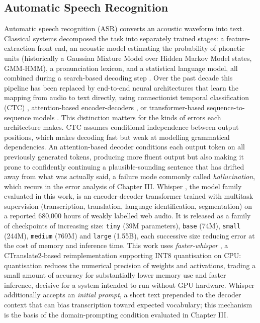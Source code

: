 \documentclass[12pt]{report}
\begin{document}
\subsection{Automatic Speech Recognition}
Automatic speech recognition (ASR) converts an acoustic waveform into text. Classical systems decomposed the task into separately trained stages: a feature-extraction front end, an acoustic model estimating the probability of phonetic units (historically a Gaussian Mixture Model over Hidden Markov Model states, GMM-HMM), a pronunciation lexicon, and a statistical language model, all combined during a search-based decoding step \cite{li2014overview}. Over the past decade this pipeline has been replaced by end-to-end neural architectures that learn the mapping from audio to text directly, using connectionist temporal classification (CTC) \cite{graves2012sequence}, attention-based encoder-decoders \cite{bahdanau2016end}, or transformer-based sequence-to-sequence models \cite{vaswani2017attention}.
This distinction matters for the kinds of errors each architecture makes. CTC assumes conditional independence between output positions, which makes decoding fast but weak at modelling grammatical dependencies. An attention-based decoder conditions each output token on all previously generated tokens, producing more fluent output but also making it prone to confidently continuing a plausible-sounding sentence that has drifted away from what was actually said, a failure mode commonly called \textit{hallucination}, which recurs in the error analysis of Chapter III.
Whisper \cite{radford2023robust}, the model family evaluated in this work, is an encoder-decoder transformer trained with multitask supervision (transcription, translation, language identification, segmentation) on a reported 680{,}000 hours of weakly labelled web audio. It is released as a family of checkpoints of increasing size: \texttt{tiny} (39M parameters), \texttt{base} (74M), \texttt{small} (244M), \texttt{medium} (769M) and \texttt{large} (1.55B), each successive size reducing error at the cost of memory and inference time. This work uses \textit{faster-whisper} \cite{fasterwhisper2023}, a CTranslate2-based reimplementation supporting INT8 quantisation on CPU: quantisation reduces the numerical precision of weights and activations, trading a small amount of accuracy for substantially lower memory use and faster inference, decisive for a system intended to run without GPU hardware. Whisper additionally accepts an \textit{initial prompt}, a short text prepended to the decoder context that can bias transcription toward expected vocabulary; this mechanism is the basis of the domain-prompting condition evaluated in Chapter III.
\end{document}
